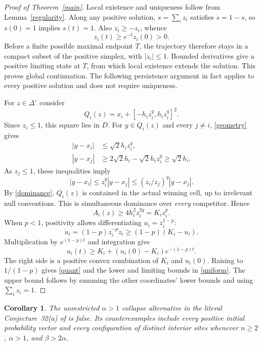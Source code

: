 \documentclass[11pt]{article}
\newtheorem{corollary}[theorem]{Corollary}
\begin{document}
\begin{proof}[Proof of Theorem~\ref{main}]
Local existence and uniqueness follow from Lemma~\ref{regularity}. Along any positive solution, $s=\sum_i z_i$ satisfies $\dot s=1-s$, so $s(0)=1$ implies $s(t)=1$. Also $\dot z_i\geq-z_i$, whence
\[
 z_i(t)\geq e^{-t}z_i(0)>0.
\]
Before a finite possible maximal endpoint $T$, the trajectory therefore stays in a compact subset of the positive simplex, with $|\dot z_i|\leq1$. Bounded derivatives give a positive limiting state at $T$, from which local existence extends the solution. This proves global continuation. The following persistence argument in fact applies to every positive solution and does not require uniqueness.

For $z\in\Delta^\circ$ consider
\[
 Q_i(z)=x_i+[-h_i z_i^q,h_i z_i^q]^2.
\]
Since $z_i\leq1$, this square lies in $D$. For $y\in Q_i(z)$ and every $j\ne i$, \eqref{geometry} gives
\begin{align*}
 |y-x_i|&\leq\sqrt2h_i z_i^q,\\
 |y-x_j|&\geq2\sqrt2h_i-\sqrt2h_i z_i^q\geq\sqrt2h_i.
\end{align*}
As $z_j\leq1$, these inequalities imply
\[
 |y-x_i|\leq z_i^q|y-x_j|
             \leq(z_i/z_j)^q|y-x_j|.
\]
By \eqref{dominance}, $Q_i(z)$ is contained in the actual winning cell, up to irrelevant null conventions. This is simultaneous dominance over \emph{every} competitor. Hence
\begin{equation}
 A_i(z)\geq4h_i^2z_i^{2q}=K_i z_i^p.\label{area}
\end{equation}
When $p<1$, positivity allows differentiating $u_i=z_i^{1-p}$:
\[
 \dot u_i=(1-p)z_i^{-p}\dot z_i
       \geq(1-p)(K_i-u_i).
\]
Multiplication by $e^{(1-p)t}$ and integration give
\[
 u_i(t)\geq K_i+(u_i(0)-K_i)e^{-(1-p)t}.
\]
The right side is a positive convex combination of $K_i$ and $u_i(0)$. Raising to $1/(1-p)$ gives \eqref{quant} and the lower and limiting bounds in \eqref{uniform}. The upper bound follows by summing the other coordinates' lower bounds and using $\sum_i z_i=1$.
\end{proof}

\begin{corollary}\label{counter}
The unrestricted $\alpha>1$ collapse alternative in the literal Conjecture~32(a) of \cite{Ald07} is false. Its counterexamples include every positive initial probability vector and every configuration of distinct interior sites whenever $n\geq2$, $\alpha>1$, and $\beta>2\alpha$.
\end{corollary}
\end{document}
